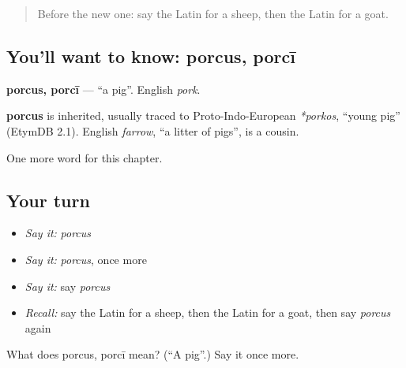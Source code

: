 \label{lesson:LA-C90-porcus}



\begin{quote}
Before the new one: say the Latin for a sheep, then the Latin for a goat.
\end{quote}

\subsection*{You'll want to know: porcus, porcī}
\textbf{porcus, porcī} — \textquotedblleft{}a pig\textquotedblright{}. English \emph{pork}.

\begin{cousinweb}
\textbf{porcus} is inherited, usually traced to Proto-Indo-European \emph{*porkos}, \textquotedblleft{}young pig\textquotedblright{} (EtymDB 2.1). English \emph{farrow}, \textquotedblleft{}a litter of pigs\textquotedblright{}, is a cousin.
\end{cousinweb}

\begin{grammarlens}[title={What you've built}]
One more word for this chapter.
\end{grammarlens}

\subsection*{Your turn}
\begin{itemize}
\raggedright
  \item \emph{Say it:} \emph{porcus}
  \item \emph{Say it:} \emph{porcus}, once more
  \item \emph{Say it:} say \emph{porcus}
  \item \emph{Recall:} say the Latin for a sheep, then the Latin for a goat, then say \emph{porcus} again
\end{itemize}

\begin{tcolorbox}[breakable,colback=teal!4,colframe=teal!35!black,title={Before you move on}]
What does porcus, porcī mean? (\textquotedblleft{}A pig\textquotedblright{}.) Say it once more.
\end{tcolorbox}

